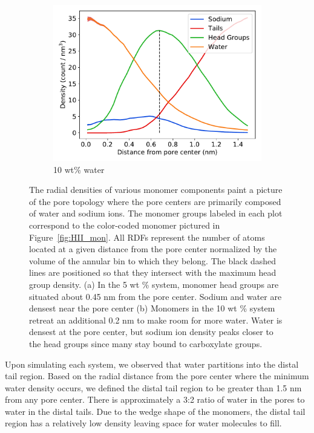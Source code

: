 \documentclass{article}
\begin{document}
\begin{figure}
\begin{subfigure}{0.49\linewidth}
  \includegraphics[width=\linewidth]{component_density_10wt.pdf}
  \caption{10 wt\% water}\label{fig:component_density_10wt}
  \end{subfigure}
  \caption{The radial densities of various monomer components paint a
  picture of the pore topology where the pore centers are primarily composed
  of water and sodium ions. 
The monomer groups labeled in each plot correspond to
  the color-coded monomer pictured in Figure~\ref{fig:HII_mon}. All RDFs
  represent the number of atoms located at a given distance from the pore center
  normalized by the volume of the annular bin to which they belong. The black
  dashed lines are positioned so that they intersect with the maximum head group
  density. (a) In the 5 wt \% system, monomer head groups are situated about 0.45 nm
  from the pore center. Sodium and water are densest near the pore center 
  (b) Monomers in the 10 wt \% system retreat an additional 0.2 nm to make room
  for more water. Water is densest at the pore center, but sodium ion density
  peaks closer to the head groups since many stay bound to carboxylate groups.}\label{fig:component_densities}
  \vspace{-0.75cm}
  \end{figure}
  
  Upon simulating each system, we observed that water partitions into the
  distal tail region. Based on the radial distance from the pore center where 
  the minimum water density occurs, we defined the distal tail region to 
  be greater than 1.5 nm from any pore center. There
  is approximately a 3:2 ratio of water in the pores to water in the 
  distal tails. Due to the wedge shape of the monomers, the distal tail
  region has a relatively low density leaving space for water molecules 
  to fill.
  
\end{document}
